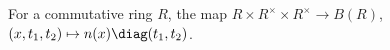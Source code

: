 For a commutative ring $R$, the map $R\times R^\times\times R^\times\to B(R)$, $(x,t_1,t_2)\mapsto n(x)\diag(t_1,t_2)$.
